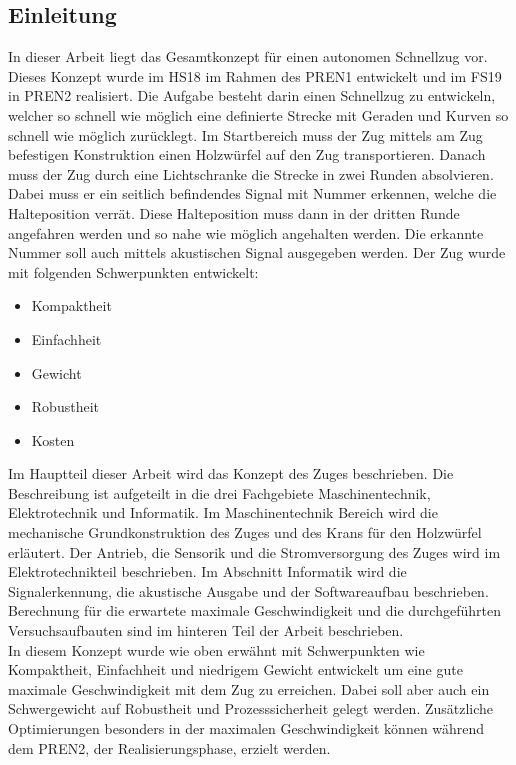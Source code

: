 \documentclass[../../main.tex]{subfiles}
\begin{document}
\subsection{Einleitung}
In dieser Arbeit liegt das Gesamtkonzept für einen autonomen Schnellzug vor. Dieses Konzept wurde im HS18 im Rahmen des PREN1 entwickelt und im FS19 in PREN2 realisiert. Die Aufgabe besteht darin einen Schnellzug zu entwickeln, welcher so schnell wie möglich eine definierte Strecke mit Geraden und Kurven so schnell wie möglich zurücklegt. Im Startbereich muss der Zug mittels am Zug befestigen Konstruktion einen Holzwürfel auf den Zug transportieren. Danach muss der Zug durch eine Lichtschranke die Strecke in zwei Runden absolvieren. Dabei muss er ein seitlich befindendes Signal mit Nummer erkennen, welche die Halteposition verrät. Diese Halteposition muss dann in der dritten Runde angefahren werden und so nahe wie möglich angehalten werden. Die erkannte Nummer soll auch mittels akustischen Signal ausgegeben werden. Der Zug wurde mit folgenden Schwerpunkten entwickelt:
\begin{itemize}
    \item Kompaktheit
    \item Einfachheit
    \item Gewicht
    \item Robustheit
    \item Kosten
\end{itemize}
Im Hauptteil dieser Arbeit wird das Konzept des Zuges beschrieben. Die Beschreibung ist aufgeteilt in die drei
Fachgebiete Maschinentechnik, Elektrotechnik und Informatik. Im Maschinentechnik Bereich wird die mechanische
Grundkonstruktion des Zuges und des Krans für den Holzwürfel erläutert. Der Antrieb, die Sensorik und die
Stromversorgung des Zuges wird im Elektrotechnikteil beschrieben. Im Abschnitt Informatik wird die Signalerkennung, die
akustische Ausgabe und der Softwareaufbau beschrieben. Berechnung für die erwartete maximale Geschwindigkeit und die
durchgeführten Versuchsaufbauten sind im hinteren Teil der Arbeit beschrieben.\\
In diesem Konzept wurde wie oben erwähnt mit Schwerpunkten wie Kompaktheit, Einfachheit und niedrigem Gewicht entwickelt um eine gute maximale Geschwindigkeit mit dem Zug zu erreichen. Dabei soll aber auch ein Schwergewicht auf Robustheit und Prozesssicherheit gelegt werden. Zusätzliche Optimierungen besonders in der maximalen Geschwindigkeit können während dem PREN2, der Realisierungsphase, erzielt werden.
\pagebreak
\end{document}
